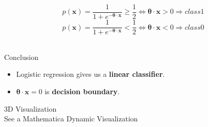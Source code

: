 \documentclass{beamer}
\begin{document}
\begin{frame}
\[p(\mathbf{x}) = \frac{1}{1+e^{-\bm{\theta} \cdot \mathbf{x}}} \geq \frac{1}{2} \Leftrightarrow \bm{\theta} \cdot \mathbf{x} > 0 \Rightarrow class 1\]
\[p(\mathbf{x}) = \frac{1}{1+e^{-\bm{\theta} \cdot \mathbf{x}}} <\frac{1}{2}  \Leftrightarrow \bm{\theta} \cdot \mathbf{x} < 0 \Rightarrow class 0\]
\\
\begin{block}{Conclusion}
\begin{itemize}
\item Logistic regression gives us a \textbf{linear classifier}. \\
\item $\bm{\theta}  \cdot \mathbf{x} = 0$ is \textbf{decision boundary}. 
\end{itemize}
\end{block}
\end{frame}
\begin{frame}
3D Visualization \\
See a Mathematica Dynamic Visualization
\end{frame}
\end{document}
